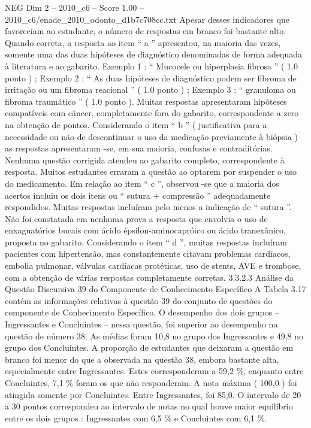 \begin{textsample}{NEG Dim 2 – 2010\_c6 – Score 1.00 – 2010\_c6/enade\_2010\_odonto\_d1b7c708cc.txt}
Apesar desses indicadores que favoreciam ao estudante, o número de respostas em branco foi bastante alto.
Quando correta, a resposta ao item “ a ” apresentou, na maioria das vezes, somente uma das duas hipóteses de diagnóstico denominadas de forma adequada à literatura e ao gabarito.
Exemplo 1 : “ Mucocele ou hiperplasia fibrosa ” ( 1.0 ponto ) ; Exemplo 2 : “ As duas hipóteses de diagnóstico podem ser fibroma de irritação ou um fibroma reacional ” ( 1.0 ponto ) ; Exemplo 3 : “ granuloma ou fibroma traumático ” ( 1.0 ponto ).
Muitas respostas apresentaram hipóteses compatíveis com câncer, completamente fora do gabarito, correspondente a zero na obtenção de pontos.
Considerando o item “ b ” ( justificativa para a necessidade ou não de descontinuar o uso da medicação previamente à biópsia ) as respostas apresentaram -se, em sua maioria, confusas e contraditórias.
Nenhuma questão corrigida atendeu ao gabarito completo, correspondente à resposta.
Muitos estudantes erraram a questão ao optarem por suspender o uso do medicamento.
Em relação ao item “ c ”, observou -se que a maioria dos acertos incluiu os dois itens ou “ sutura + compressão ” adequadamente respondidos.
Muitas respostas incluíram pelo menos a indicação de “ sutura ”.
Não foi constatada em nenhuma prova a resposta que envolvia o uso de enxaguatórios bucais com ácido épsilon-aminocapróico ou ácido tranexânico, proposta no gabarito.
Considerando o item “ d ”, muitas respostas incluíram pacientes com hipertensão, mas constantemente citavam problemas cardíacos, embolia pulmonar, válvulas cardíacas protéticas, uso de stents, AVE e trombose, com a obtenção de várias respostas completamente corretas. 3.3.2.3 Análise da Questão Discursiva 39 do Componente de Conhecimento Específico A Tabela 3.17 contém as informações relativas à questão 39 do conjunto de questões do componente de Conhecimento Específico.
O desempenho dos dois grupos – Ingressantes e Concluintes – nessa questão, foi superior ao desempenho na questão de número 38.
As médias foram 10,8 no grupo dos Ingressantes e 49,8 no grupo dos Concluintes.
A proporção de estudantes que deixaram a questão em branco foi menor do que a observada na questão 38, embora bastante alta, especialmente entre Ingressantes.
Estes corresponderam a 59,2 \%, enquanto entre Concluintes, 7,1 \% foram os que não responderam.
A nota máxima ( 100,0 ) foi atingida somente por Concluintes.
Entre Ingressantes, foi 85,0.
O intervalo de 20 a 30 pontos correspondeu ao intervalo de notas no qual houve maior equilíbrio entre os dois grupos : Ingressantes com 6,5 \% e Concluintes com 6,1 \%.

\end{textsample}
